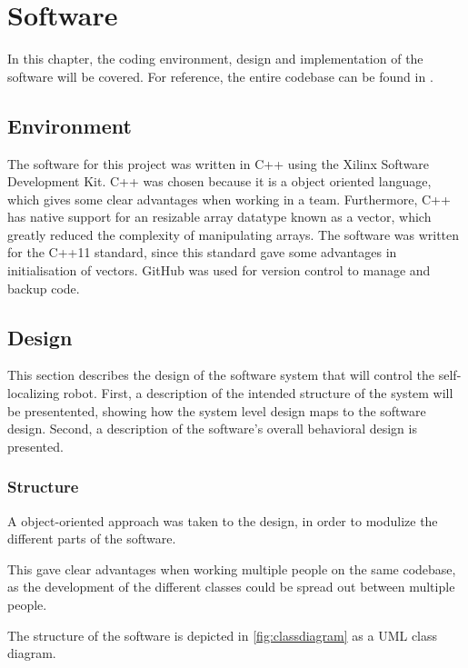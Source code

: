 \documentclass[Main]{subfiles}
\begin{document}
\section{Software} %
\label{sec:software}

	In this chapter, the coding environment, design and implementation of the software will be covered.
	For reference, the entire codebase can be found in .
	
	\subsection{Environment} %
	\label{sub:software_environment}

		The software for this project was written in C++ using the Xilinx Software Development Kit.
		C++ was chosen because it is a object oriented language, which gives some clear advantages when working in a team.
		Furthermore, C++ has native support for an resizable array datatype known as a vector, which greatly reduced the complexity of manipulating arrays.
		The software was written for the C++11 standard, since this standard gave some advantages in initialisation of vectors.
		GitHub was used for version control	to manage and backup code.
		
	\subsection{Design} %
	\label{sub:software_design}

	This section describes the design of the software system that will control the self-localizing robot.
	First, a description of the intended structure of the system will be presentented, showing how the system level design maps to the software design.
	Second, a description of the software's overall behavioral design is presented.

	\subsubsection{Structure} %
	\label{subsub:software_structure}
		A object-oriented approach was taken to the design, in order to modulize the different parts of the software. 
		
		This gave clear advantages when working multiple people on the same codebase, as the development of the different classes could be spread out between multiple people.
		
		The structure of the software is depicted in \autoref{fig:classdiagram} as a UML class diagram.
		
\end{document}
